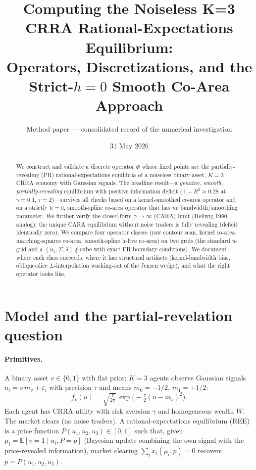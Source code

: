 \documentclass[11pt]{article}
\title{\textbf{Computing the Noiseless K=3 CRRA Rational-Expectations Equilibrium:\\
Operators, Discretizations, and the Strict-$h{=}0$ Smooth Co-Area Approach}}
\author{Method paper --- consolidated record of the numerical investigation}
\date{31 May 2026}
\begin{document}
\maketitle

\begin{abstract}
We construct and validate a discrete operator $\Phi$ whose fixed points are the partially-revealing
(PR) rational-expectations equilibria of a noiseless binary-asset, $K{=}3$ CRRA economy with Gaussian
signals. The headline result---a \emph{genuine, smooth, partially-revealing} equilibrium with positive
information deficit (\,$1{-}R^2\approx 0.28$ at $\gamma{=}0.1$, $\tau{=}2$)---survives all checks
based on a kernel-smoothed co-area operator and on a strictly $h{=}0$, smooth-spline co-area operator
that has \emph{no} bandwidth/smoothing parameter. We further verify the closed-form $\gamma\!\to\!\infty$
(CARA) limit (Hellwig 1980 analog): the unique CARA equilibrium without noise traders is fully
revealing (deficit identically zero). We compare four operator classes (raw contour scan, kernel
co-area, marching-squares co-area, smooth-spline h-free co-area) on two grids (the standard
$u$-grid and a $(u_1,\Sigma,\delta)$ $\xi$-cube with exact FR boundary conditions). We document
where each class succeeds, where it has structural artifacts (kernel-bandwidth bias, oblique-slice
$\Sigma$-interpolation washing-out of the Jensen wedge), and what the right operator looks like.
\end{abstract}

\section{Model and the partial-revelation question}\label{sec:model}

\paragraph{Primitives.}
A binary asset $v\in\{0,1\}$ with flat prior; $K{=}3$ agents observe Gaussian signals
$u_i = v\,m_v + \varepsilon_i$ with precision $\tau$ and means $m_0{=}{-}1/2,\,m_1{=}{+}1/2$:
\[
f_v(u) = \sqrt{\tfrac{\tau}{2\pi}}\,\exp\!\big({-}\tfrac{\tau}{2}(u-m_v)^2\big).
\]
Each agent has CRRA utility with risk aversion $\gamma$ and homogeneous wealth $W$. The market
clears (no noise traders). A rational-expectations equilibrium (REE) is a price function
$P(u_1,u_2,u_3)\in[0,1]$ such that, given $\mu_i = \mathbb{E}[v{=}1\mid u_i, P{=}p]$ (Bayesian update
combining the own signal with the price-revealed information), market clearing
$\sum_i x_i(\mu_i,p)=0$ recovers $p=P(u_1,u_2,u_3)$.
\end{document}
